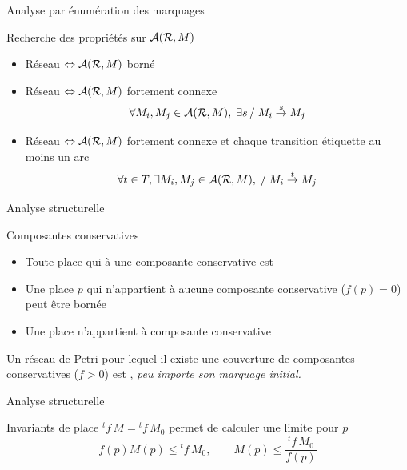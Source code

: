 \documentclass[compress]{beamer}
\begin{document}
\begin{frame}{Analyse par énumération des marquages}
\begin{block}{Recherche des propriétés sur ${\cal A(R},M)$}
\begin{itemize}
\item Réseau  $\Leftrightarrow {\cal A(R},M)$ borné
\item Réseau  $\Leftrightarrow {\cal A(R},M)$ fortement connexe
$$\forall M_i, M_j \in {\cal A(R},M), \; \exists s \, / \; M_i \stackrel{s}{\rightarrow} M_j$$
\item Réseau  $\Leftrightarrow {\cal A(R},M)$ fortement connexe et chaque transition étiquette au moins un arc
$$\forall t \in T, \exists M_i, M_j \in {\cal A(R},M), \; / \; M_i
\stackrel{t}{\rightarrow} M_j$$
\end{itemize}  
\end{block}
\end{frame}  

 
\begin{frame}{Analyse structurelle}
\begin{block}{Composantes conservatives}
\begin{itemize}
\item Toute place qui  à une composante conservative  est 
\item Une place $p$ qui n'appartient à aucune composante conservative ($f(p)=0$) peut être bornée
\item Une place  n'appartient à  composante conservative
\end{itemize}
Un réseau de Petri pour lequel il existe une couverture de composantes 
conservatives ($f>0$) est , {\it peu importe son marquage initial.}
\end{block}
\end{frame}  
 
\begin{frame}{Analyse structurelle}
\begin{block}{Invariants de place}
${}^tf \, M = {}^tf \, M_0$ permet de calculer une limite pour  $p$
$$f(p) M(p) \leq {}^tf \, M_0, \qquad M(p) \leq \frac{{}^tf \, M_0}{f(p)}$$
\end{block}
\end{frame}  
\end{document}
